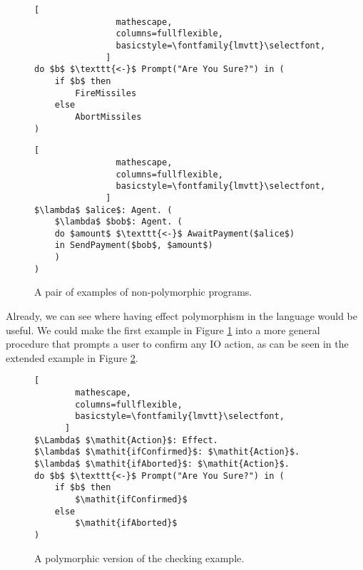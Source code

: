 \begin{figure}
    \centering
    \begin{minipage}{0.45\linewidth}
        \begin{framed}
            \begin{lstlisting}[
                mathescape,
                columns=fullflexible,
                basicstyle=\fontfamily{lmvtt}\selectfont,
              ]
do $b$ $\texttt{<-}$ Prompt("Are You Sure?") in (
    if $b$ then
        FireMissiles
    else
        AbortMissiles
)
            \end{lstlisting}        
        \end{framed}
    \end{minipage}
    \quad
    \begin{minipage}{0.45\linewidth}
        \begin{framed}
            \begin{lstlisting}[
                mathescape,
                columns=fullflexible,
                basicstyle=\fontfamily{lmvtt}\selectfont,
              ]
$\lambda$ $alice$: Agent. (
    $\lambda$ $bob$: Agent. (
    do $amount$ $\texttt{<-}$ AwaitPayment($alice$)
    in SendPayment($bob$, $amount$)
    )
)
              \end{lstlisting}
        \end{framed}
    \end{minipage}
    \caption{A pair of examples of non-polymorphic programs.}
    \label{CheckExample}
\end{figure}



Already, we can see where having effect polymorphism in the language would be useful. We could make the first example in Figure \ref{CheckExample} into a more general procedure that prompts a user to confirm any IO action, as can be seen in the extended example in Figure \ref{PolymorphicCheckExample}.

\begin{figure}
\begin{framed}
    \begin{lstlisting}[
        mathescape,
        columns=fullflexible,
        basicstyle=\fontfamily{lmvtt}\selectfont,
      ]
$\Lambda$ $\mathit{Action}$: Effect. 
$\lambda$ $\mathit{ifConfirmed}$: $\mathit{Action}$.
$\lambda$ $\mathit{ifAborted}$: $\mathit{Action}$.
do $b$ $\texttt{<-}$ Prompt("Are You Sure?") in (
    if $b$ then 
        $\mathit{ifConfirmed}$ 
    else
        $\mathit{ifAborted}$
)
    \end{lstlisting}        
\end{framed}
\caption{A polymorphic version of the checking example.}
\label{PolymorphicCheckExample}
\end{figure}



